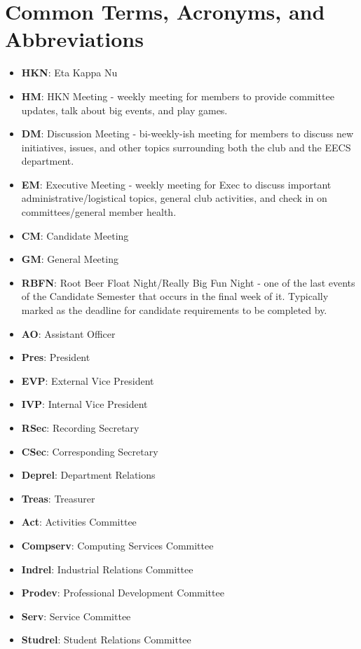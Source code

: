 \documentclass[11pt, article, oneside]{memoir}
\begin{document}
    \chapter{Common Terms, Acronyms, and Abbreviations}
    \begin{itemize}
        \item \textbf{HKN}: Eta Kappa Nu
        \item \textbf{HM}: HKN Meeting - weekly meeting for members to provide committee updates, talk about big events, and play games.
        \item \textbf{DM}: Discussion Meeting - bi-weekly-ish meeting for members to discuss new initiatives, issues, and other topics surrounding both the club and the EECS department.
        \item \textbf{EM}: Executive Meeting - weekly meeting for Exec to discuss important administrative/logistical topics, general club activities, and check in on committees/general member health.
        \item \textbf{CM}: Candidate Meeting
        \item \textbf{GM}: General Meeting
        \item \textbf{RBFN}: Root Beer Float Night/Really Big Fun Night - one of the last events of the Candidate Semester that occurs in the final week of it.
            Typically marked as the deadline for candidate requirements to be completed by.
        \item \textbf{AO}: Assistant Officer
        \item \textbf{Pres}: President
        \item \textbf{EVP}: External Vice President
        \item \textbf{IVP}: Internal Vice President
        \item \textbf{RSec}: Recording Secretary
        \item \textbf{CSec}: Corresponding Secretary
        \item \textbf{Deprel}: Department Relations
        \item \textbf{Treas}: Treasurer
        \item \textbf{Act}: Activities Committee
        \item \textbf{Compserv}: Computing Services Committee
        \item \textbf{Indrel}: Industrial Relations Committee
        \item \textbf{Prodev}: Professional Development Committee
        \item \textbf{Serv}: Service Committee
        \item \textbf{Studrel}: Student Relations Committee
    \end{itemize}
    
\end{document}
